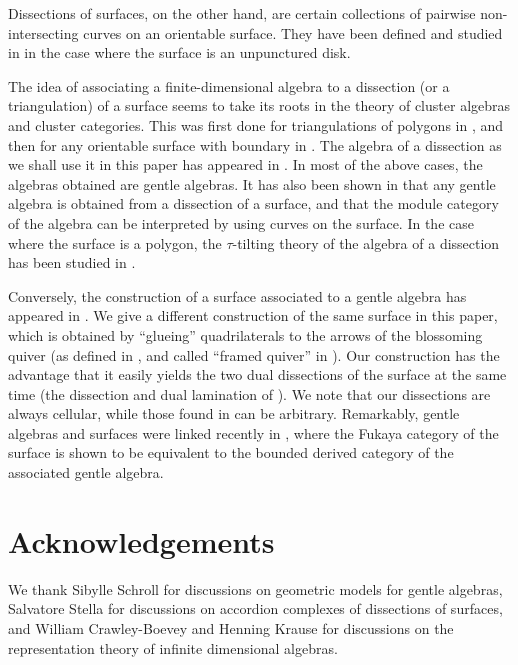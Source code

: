 \documentclass{amsart}
\theoremstyle{definition}
\begin{document}
Dissections of surfaces, on the other hand, are certain collections of pairwise non-intersecting curves on an orientable surface.
They have been defined and studied in \cite{Baryshnikov, Chapoton-quadrangulations, GarverMcConville, MannevillePilaud-accordion} in the case where the surface is an unpunctured disk.

The idea of associating a finite-dimensional algebra to a dissection (or a triangulation) of a surface seems to take its roots in the theory of cluster algebras and cluster categories.
This was first done for triangulations of polygons in \cite{CalderoChapotonSchiffler}, and then for any orientable surface with boundary in \cite{ABCP, Labardini}.  
The algebra of a dissection as we shall use it in this paper has appeared in \cite{DavidRoeslerSchiffler}.
In most of the above cases, the algebras obtained are gentle algebras.
It has also been shown in \cite{BaurSimoes} that any gentle algebra is obtained from a dissection of a surface, and that the module category of the algebra can be interpreted by using curves on the surface.
In the case where the surface is a polygon, the $\tau$-tilting theory of the algebra of a dissection has been studied in \cite{PaluPilaudPlamondon, PilaudPlamondonStella}.

Conversely, the construction of a surface associated to a gentle algebra has appeared in \cite{OpperPlamondonSchroll}.
We give a different construction of the same surface in this paper, which is obtained by ``glueing'' quadrilaterals to the arrows of the blossoming quiver (as defined in \cite{PaluPilaudPlamondon}, and called ``framed quiver'' in \cite{BrustleDouvilleMousavandThomasYildirim}).
Our construction has the advantage that it easily yields the two dual dissections of the surface at the same time (the dissection and dual lamination of \cite{OpperPlamondonSchroll}).
We note that our dissections are always cellular, while those found in \cite{BaurSimoes} can be arbitrary.
Remarkably, gentle algebras and surfaces were linked recently in \cite{HaidenKatzarkovKontsevich}, where the Fukaya category of the surface is shown to be equivalent to the bounded derived category of the associated gentle algebra.

\section*{Acknowledgements}
We thank Sibylle Schroll for discussions on geometric models for gentle algebras, Salvatore Stella for discussions on accordion complexes of dissections of surfaces, and William Crawley-Boevey and Henning Krause for discussions on the representation theory of infinite dimensional algebras. 
\end{document}

